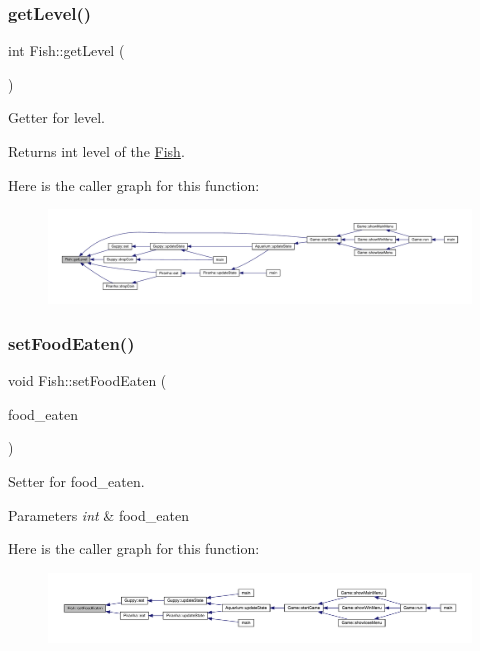 \subsubsection{\texorpdfstring{get\+Level()}{getLevel()}}
{\footnotesize\ttfamily int Fish\+::get\+Level (\begin{DoxyParamCaption}{ }\end{DoxyParamCaption})}



Getter for level. 

\begin{DoxyReturn}{Returns}
int level of the \mbox{\hyperlink{class_fish}{Fish}}. 
\end{DoxyReturn}
Here is the caller graph for this function\+:
\nopagebreak
\begin{figure}[H]
\begin{center}
\leavevmode
\includegraphics[width=350pt]{class_fish_a3f9ad26c3d1dfbc3d1334065691d55da_icgraph}
\end{center}
\end{figure}
\mbox{\label{class_fish_a37379e4c783602bd7c3d475a67167c11}} 
\subsubsection{\texorpdfstring{set\+Food\+Eaten()}{setFoodEaten()}}
{\footnotesize\ttfamily void Fish\+::set\+Food\+Eaten (\begin{DoxyParamCaption}\item[{int}]{food\+\_\+eaten }\end{DoxyParamCaption})}



Setter for food\+\_\+eaten. 


\begin{DoxyParams}{Parameters}
{\em int} & food\+\_\+eaten \\
\hline
\end{DoxyParams}
Here is the caller graph for this function\+:
\nopagebreak
\begin{figure}[H]
\begin{center}
\leavevmode
\includegraphics[width=350pt]{class_fish_a37379e4c783602bd7c3d475a67167c11_icgraph}
\end{center}
\end{figure}
\mbox{\label{class_fish_a8b24063bf538f0502cf38ce5859aec8e}} 
